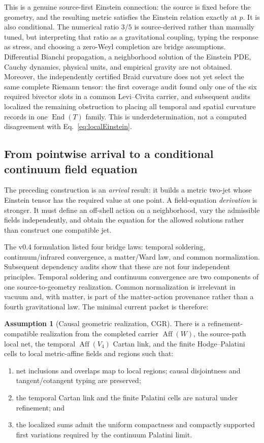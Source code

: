 \documentclass[11pt]{article}
\theoremstyle{definition}
\newtheorem{assumption}[theorem]{Assumption}
\theoremstyle{remark}
\begin{document}
This is a genuine source-first Einstein connection: the source is fixed before the geometry, and the resulting metric satisfies the Einstein relation exactly at $p$. It is also conditional. The numerical ratio $3/5$ is source-derived rather than manually tuned, but interpreting that ratio as a gravitational coupling, typing the response as stress, and choosing a zero-Weyl completion are bridge assumptions. Differential Bianchi propagation, a neighborhood solution of the Einstein PDE, Cauchy dynamics, physical units, and empirical gravity are not obtained. Moreover, the independently certified Braid curvature does not yet select the same complete Riemann tensor: the first coverage audit found only one of the six required bivector slots in a common Levi--Civita carrier, and subsequent audits localized the remaining obstruction to placing all temporal and spatial curvature records in one $\operatorname{End}(T)$ family. This is underdetermination, not a computed disagreement with Eq.~\eqref{eq:localEinstein}.

\subsection{From pointwise arrival to a conditional continuum field equation}

The preceding construction is an \emph{arrival} result: it builds a metric two-jet whose Einstein tensor has the required value at one point. A field-equation \emph{derivation} is stronger. It must define an off-shell action on a neighborhood, vary the admissible fields independently, and obtain the equation for the allowed solutions rather than construct one compatible jet.

The v0.4 formulation listed four bridge laws: temporal soldering, continuum/infrared convergence, a matter/Ward law, and common normalization. Subsequent dependency audits show that these are not four independent principles. Temporal soldering and continuum convergence are two components of one source-to-geometry realization. Common normalization is irrelevant in vacuum and, with matter, is part of the matter-action provenance rather than a fourth gravitational law. The minimal current packet is therefore:

\begin{assumption}[Causal geometric realization, CGR]\label{ass:cgr}
There is a refinement-compatible realization from the completed carrier $\operatorname{Aff}(W)$, the source-path local net, the temporal $\operatorname{Aff}(V_4)$ Cartan link, and the finite Hodge--Palatini cells to local metric-affine fields and regions such that:
\begin{enumerate}[label=(\roman*)]
\item net inclusions and overlaps map to local regions; causal disjointness and tangent/cotangent typing are preserved;
\item the temporal Cartan link and the finite Palatini cells are natural under refinement; and
\item the localized sums admit the uniform compactness and compactly supported first variations required by the continuum Palatini limit.
\end{enumerate}
\end{assumption}
\end{document}

